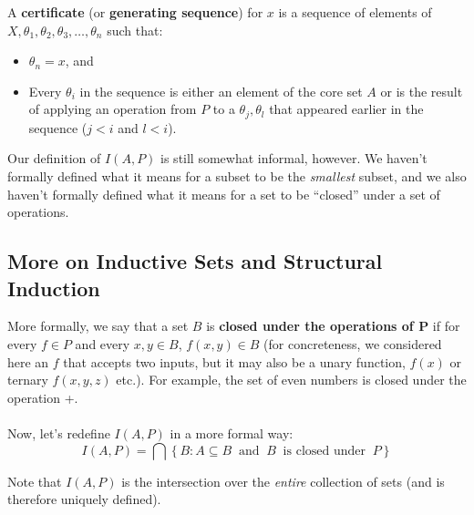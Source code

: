 \documentclass[]{article}
\theoremstyle{definition}
\newcommand{\lecture}[1]{\marginpar{{\footnotesize $\leftarrow$ \underline{#1}}}}
\begin{document}
\begin{enumerate}
          A \textbf{certificate} (or \textbf{generating sequence}) for $x$ is a sequence of elements of $X, \theta_1, \theta_2, \theta_3, \ldots, \theta_n$ such that:
          \begin{itemize}
            \item $\theta_n = x$, and
            \item Every $\theta_i$ in the sequence is either an element of the core set $A$ or is the result of applying an operation from $P$ to a $\theta_j, \theta_l$ that appeared earlier in the sequence ($j < i$ and $l < i$). \lecture{September 12, 2013}
          \end{itemize}
        \end{enumerate}

        Our definition of $I(A, P)$ is still somewhat informal, however. We haven't formally defined what it means for a subset to be the \emph{smallest} subset, and we also haven't formally defined what it means for a set to be ``closed'' under a set of operations.

        \subsection{More on Inductive Sets and Structural Induction}
        More formally, we say that a set $B$ is \textbf{closed under the operations of $\boldsymbol P$} if for every $f \in P$ and every $x, y \in B$, $f(x, y) \in B$ (for concreteness, we considered here an $f$ that accepts two inputs, but it may also be a unary function, $f(x)$ or ternary $f(x,y, z)$ etc.). For example, the set of even numbers is closed under the operation +.
        \\ \\
        Now, let's redefine $I(A, P)$ in a more formal way:
        $$
          I(A, P) = \bigcap \left\{ B : A \subseteq B ~\text{ and } ~B ~\text{ is closed under } ~P \right\}
        $$

        Note that $I(A, P)$ is the intersection over the \emph{entire} collection of sets (and is therefore uniquely defined).
\end{document}
